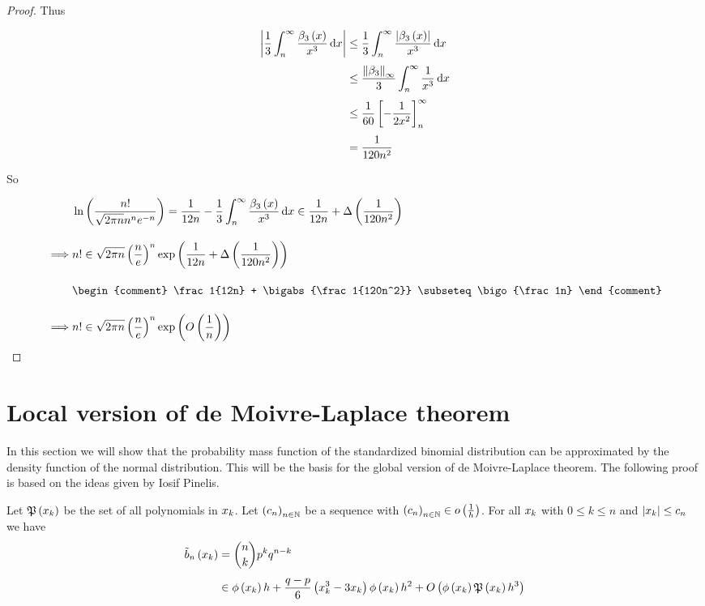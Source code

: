 \begin{proof}
  \noindent Thus

  \begin{align}
    \abs{\frac 13\int_n^\infty \frac{\bp[3]{x}}{x^3} \d{x}} & \le \frac 13 \int_n^\infty \frac{\abs{\bp[3]{x}}}{x^3} \d{x} \nl
    & \le \frac{\snorm{\bps[3]}}{3} \int_n^\infty \frac 1{x^3} \d{x} \nl
    & \le \frac{1}{60} \left[-\frac{1}{2x^2}\right]_n^\infty \nl
    & = \frac 1{120n^2}
  \end{align}

  \noindent So

  \begin{align}
    & \ln\left(\frac{n!}{\sqrt{2\pi n}n^n e^{-n}}\right) = \frac 1{12n} - \frac 13 \int_n^\infty \frac{\bp[3]{x}}{x^3} \d{x} \in \frac 1{12n} + \bigabs{\frac{1}{120n^2}} \bnl
    \implies & n! \in \sqrt{2\pi n} \left(\frac ne\right)^n \fexp{\frac 1{12n} + \bigabs{\frac 1{120n^2}}} \bnl
    &
    \begin{comment}
      \frac 1{12n} + \bigabs{\frac 1{120n^2}} \subseteq \bigo{\frac 1n}
    \end{comment} \bnl
    \implies & n! \in \sqrt{2\pi n} \left(\frac ne\right)^n \fexp{\bigo{\frac 1n}}
  \end{align}
\end{proof}

\section{Local version of de Moivre-Laplace theorem}

In this section we will show that the probability mass function of the standardized binomial distribution can be approximated by the density function of the normal distribution. This will be the basis for the global version of de Moivre-Laplace theorem. The following proof is based on the ideas given by Iosif Pinelis\cite{iosif}.

\begin{theorem}
  Let $\mathfrak P\left( {x_{k}} \right)$ be the set of all polynomials in $x_{k}$. Let $\left({c_n}\right)_{{n}\in\mathbb N}$ be a sequence with $\left({c_n}\right)_{{n}\in\mathbb N} \in o\left( {\frac 1h} \right)$. For all $x_{k}$ with $0\le k\le n$ and $\left|{x_k}\right| \le c_n$ we have
  \begin{align}
    \bb{x_k} &= \binom nk p^k q^{n-k} \nl
    &\in \fphi{\x} h +\frac{q-p}6 \left(\x^3-3\x\right) \fphi{\x} h^2 + \bigo{\fphi{\x}\pol{\x}h^3}
  \end{align}
\end{theorem}

